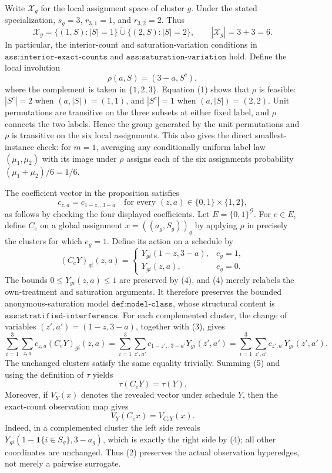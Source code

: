 Write \(\mathcal X_g\) for the local assignment space of cluster \(g\).  Under the stated specialization, \(s_g=3\), \(r_{3,1}=1\), and \(r_{3,2}=2\).  Thus
\[
 \mathcal X_g=\{(1,S):|S|=1\}\mathbin{\dot\cup}
                 \{(2,S):|S|=2\},
 \qquad |\mathcal X_g|=3+3=6.                                      \tag{1}
\]
In particular, the interior-count and saturation-variation conditions in
\(\texttt{ass:interior-exact-counts}\) and
\(\texttt{ass:saturation-variation}\) hold.  Define the local involution
\[
 \rho(a,S)=(3-a,S^c),                                                \tag{2}
\]
where the complement is taken in \(\{1,2,3\}\).  Equation (1) shows that
\(\rho\) is feasible: \(|S^c|=2\) when \((a,|S|)=(1,1)\), and
\(|S^c|=1\) when \((a,|S|)=(2,2)\).  Unit permutations are transitive on
the three subsets at either fixed label, and \(\rho\) connects the two
labels.  Hence the group generated by the unit permutations and \(\rho\)
is transitive on the six local assignments.  This also gives the direct
smallest-instance check: for \(m=1\), averaging any conditionally uniform
label law \((\mu_1,\mu_2)\) with its image under \(\rho\) assigns each of
the six assignments probability
\((\mu_1+\mu_2)/6=1/6\).

The coefficient vector in the proposition satisfies
\[
 c_{z,a}=c_{1-z,,3-a}
 \quad\text{for every }(z,a)\in\{0,1\}\times\{1,2\},                \tag{3}
\]
as follows by checking the four displayed coefficients.  Let
\(E=\{0,1\}^{\mathcal G}\).  For \(e\in E\), define \(C_e\) on a global
assignment \(x=((a_g,S_g))_g\) by applying \(\rho\) in precisely the
clusters for which \(e_g=1\).  Define its action on a schedule by
\[
 (C_eY)_{gi}(z,a)=
 \begin{cases}
 Y_{gi}(1-z,3-a),&e_g=1,\\
 Y_{gi}(z,a),&e_g=0.
 \end{cases}                                                        \tag{4}
\]
The bounds \(0\le Y_{gi}(z,a)\le1\) are preserved by (4), and (4) merely
relabels the own-treatment and saturation arguments.  It therefore
preserves the bounded anonymous-saturation model
\(\texttt{def:model-class}\), whose structural content is
\(\texttt{ass:stratified-interference}\).  For each complemented cluster,
the change of variables \((z',a')=(1-z,3-a)\), together with (3), gives
\[
 \sum_{i=1}^3\sum_{z,a}c_{z,a}(C_eY)_{gi}(z,a)
 =\sum_{i=1}^3\sum_{z',a'}c_{1-z',,3-a'}Y_{gi}(z',a')
 =\sum_{i=1}^3\sum_{z',a'}c_{z',a'}Y_{gi}(z',a').                    \tag{5}
\]
The unchanged clusters satisfy the same equality trivially.  Summing (5)
and using the definition of \(\tau\) yields
\[
 \tau(C_eY)=\tau(Y).                                                 \tag{6}
\]
Moreover, if \(V_Y(x)\) denotes the revealed vector under schedule \(Y\),
then the exact-count observation map gives
\[
 V_Y(C_ex)=V_{C_eY}(x).                                              \tag{7}
\]
Indeed, in a complemented cluster the left side reveals
\(Y_{gi}(1-\mathbf 1\{i\in S_g\},3-a_g)\), which is exactly the right
side by (4); all other coordinates are unchanged.  Thus (2) preserves the
actual observation hyperedges, not merely a pairwise surrogate.

